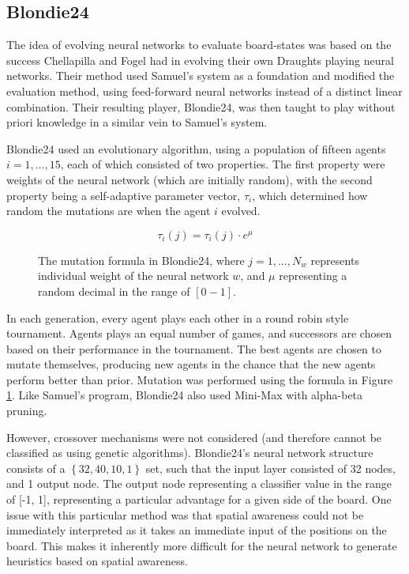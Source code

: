 \documentclass[12pt,a4paper]{article}
\begin{document}
    \subsection{Blondie24}
        The idea of evolving neural networks to evaluate board-states was based on the success Chellapilla and Fogel had in evolving their own Draughts playing neural networks. Their method used Samuel's system as a foundation and modified the evaluation method, using feed-forward neural networks instead of a distinct linear combination. Their resulting player, Blondie24, was then taught to play without priori knowledge in a similar vein to Samuel's system. \cite{chellapilla_evolving_1999}

        Blondie24 used an evolutionary algorithm, using a population of fifteen agents $i=1,\dots,15$, each of which consisted of two properties. The first property were weights of the neural network (which are initially random), with the second property being a self-adaptive parameter vector, $\tau_i$, which determined how random the mutations are when the agent $i$ evolved. 

        \begin{figure}[ht!]
            \centering
            \begin{equation}
            \tau_i(j) = \tau_i(j) \cdot e^{\mu}
            \end{equation}
            \caption{The mutation formula in Blondie24, where $j=1,...,N_w$ represents individual weight of the neural network $w$, and $\mu$ representing a random decimal in the range of $[0-1]$. \label{blondieMutation}}
        \end{figure}
        
        In each generation, every agent plays each other in a round robin style tournament. Agents plays an equal number of games, and successors are chosen based on their performance in the tournament. The best agents are chosen to mutate themselves, producing new agents in the chance that the new agents perform better than prior. Mutation was performed using the formula in Figure \ref{blondieMutation}. Like Samuel's program, Blondie24 also used Mini-Max with alpha-beta pruning.

        However, crossover mechanisms were not considered (and therefore cannot be classified as using genetic algorithms). Blondie24's neural network structure consists of a $\left\{ 32,40,10,1 \right\}$ set, such that the input layer consisted of 32 nodes, and 1 output node. The output node representing a classifier value in the range of [-1, 1], representing a particular advantage for a given side of the board. One issue with this particular method was that spatial awareness could not be immediately interpreted as it takes an immediate input of the positions on the board. This makes it inherently more difficult for the neural network to generate heuristics based on spatial awareness.
\end{document}
